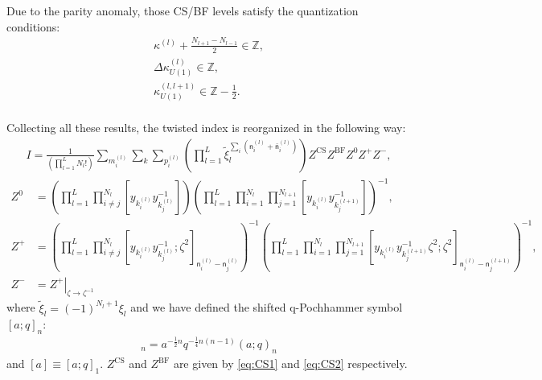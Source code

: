 \documentclass[a4paper,11pt]{article}
\begin{document}
Due to the parity anomaly, those CS/BF levels satisfy the quantization conditions:
\begin{gather}
\kappa^{(l)}+\frac{N_{l+1}-N_{l-1}}{2} \in \mathbb Z, \\
\Delta \kappa_{U(1)}^{(l)} \in \mathbb Z, \\
\kappa_{U(1)}^{(l,l+1)} \in \mathbb Z-\frac{1}{2}.
\end{gather}
\\


Collecting all these results, the twisted index is reorganized in the following way:
\begin{align}
I = \frac{1}{\left(\prod_{l = 1}^L N_l!\right)} \sum_{m^{(l)}_i} \sum_{k} \sum_{p^{(l)}_i} \left(\prod_{l = 1}^L \tilde \xi_l^{\sum_i (\mathsf n^{(l)}_i+\mathsf{\bar n}^{(l)}_i)}\right) Z^\text{CS} Z^\text{BF} Z^0 Z^+ Z^-,
\end{align}
%
\begin{align}
%
Z^0 &= \left(\prod_{l = 1}^L \prod_{i \neq j}^{N_l} \left[y_{k^{(l)}_i} y_{k^{(l)}_j}^{-1}\right]\right) \left(\prod_{l = 1}^L \prod_{i = 1}^{N_l} \prod_{j = 1}^{N_{l+1}} \left[y_{k^{(l)}_i} y_{k^{(l+1)}_j}^{-1}\right]\right)^{-1}, \\
%
Z^+ &= \left(\prod_{l = 1}^L \prod_{i \neq j}^{N_l} \left[y_{k^{(l)}_i} y_{k^{(l)}_j}^{-1};\zeta^2\right]_{\mathsf n^{(l)}_i-\mathsf n^{(l)}_j}\right)^{-1} \left(\prod_{l = 1}^L \prod_{i = 1}^{N_l} \prod_{j = 1}^{N_{l+1}} \left[y_{k^{(l)}_i} y_{k^{(l+1)}_j}^{-1} \zeta^2;\zeta^2\right]_{\mathsf n^{(l)}_i-\mathsf n^{(l+1)}_j}\right)^{-1}, \label{eq:vort} \\
%
Z^- &= \left.Z^+\right|_{\zeta \rightarrow \zeta^{-1}}
%
\end{align}
where $\tilde \xi_l = (-1)^{N_l+1} \xi_l$ and we have defined the shifted q-Pochhammer symbol $[a;q]_n$:
\begin{align}
[a;q]_n = a^{-\frac{1}{2} n} q^{-\frac{1}{4} n (n-1)} (a;q)_n
\end{align}
and $[a] \equiv [a;q]_1$. $Z^\text{CS}$ and $Z^\text{BF}$ are given by \eqref{eq:CS1} and \eqref{eq:CS2} respectively.
\end{document}
